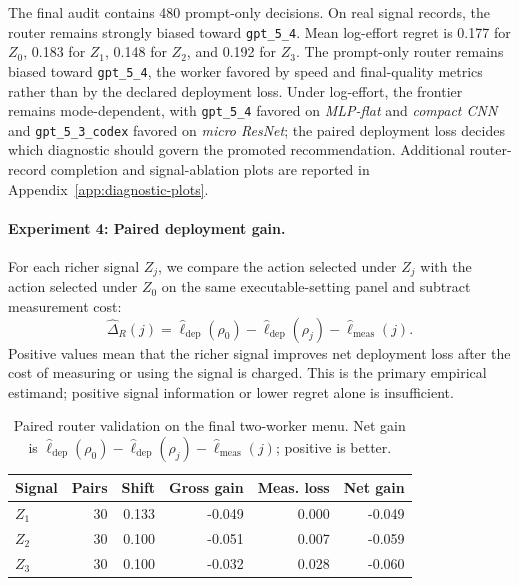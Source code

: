 \documentclass{article}
\begin{document}
The final audit contains 480 prompt-only decisions.
On real signal records, the router remains strongly biased toward \texttt{gpt\_5\_4}.
Mean log-effort regret is 0.177 for \(Z_0\), 0.183 for \(Z_1\), 0.148 for \(Z_2\), and 0.192 for \(Z_3\). The prompt-only router remains biased toward \texttt{gpt\_5\_4}, the worker favored by speed and final-quality metrics rather than by the declared deployment loss.
Under log-effort, the frontier remains mode-dependent, with \texttt{gpt\_5\_4} favored on \textit{MLP-flat} and \textit{compact CNN} and \texttt{gpt\_5\_3\_codex} favored on \textit{micro ResNet}; the paired deployment loss decides which diagnostic should govern the promoted recommendation.
Additional router-record completion and signal-ablation plots are reported in Appendix~\ref{app:diagnostic-plots}.

\paragraph{Experiment 4: Paired deployment gain.}
For each richer signal \(Z_j\), we compare the action selected under \(Z_j\) with the action selected under \(Z_0\) on the same executable-setting panel and subtract measurement cost:
\[
\widehat{\Delta}_R(j)=
\widehat{\ell}_{\mathrm{dep}}(\rho_0)-
\widehat{\ell}_{\mathrm{dep}}(\rho_j)-
\widehat{\ell}_{\mathrm{meas}}(j).
\]
Positive values mean that the richer signal improves net deployment loss after the cost of measuring or using the signal is charged.
This is the primary empirical estimand; positive signal information or lower regret alone is insufficient.

\begin{table}[t]
\centering
\small
\caption{Paired router validation on the final two-worker menu.
Net gain is \(\widehat{\ell}_{\mathrm{dep}}(\rho_0)-\widehat{\ell}_{\mathrm{dep}}(\rho_j)-\widehat{\ell}_{\mathrm{meas}}(j)\); positive is better.}
\label{tab:twomodel-router-gain}
\begin{tabular}{@{}lrrrrr@{}}
\toprule
Signal & Pairs & Shift & Gross gain & Meas. loss & Net gain \\
\midrule
\(Z_1\) & 30 & 0.133 & -0.049 & 0.000 & -0.049 \\
\(Z_2\) & 30 & 0.100 & -0.051 & 0.007 & -0.059 \\
\(Z_3\) & 30 & 0.100 & -0.032 & 0.028 & -0.060 \\
\bottomrule
\end{tabular}
\end{table}
\end{document}

